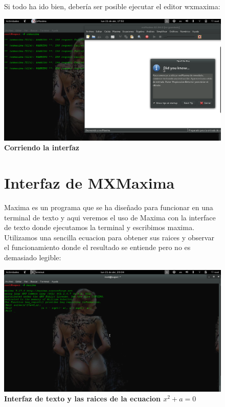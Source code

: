 \documentclass[10pt,a4paper]{book}
\begin{document}
\begin{small}
\begin{enumerate}
\begin{figure}[htb]
Si todo ha ido bien, debería ser posible ejecutar el editor wxmaxima:\\
\begin{center}
\includegraphics[width=13cm]{fotos/cap7}
\caption{\textbf{Corriendo la interfaz}}
\end{center}
\end{figure}
\end{enumerate}


\begin{figure}[htb]
\vspace*{-2,5in}
\section{Interfaz de MXMaxima}

Maxima es un programa que se ha diseñado para funcionar en una terminal de texto y aqui veremos el uso de Maxima con la interface de texto donde ejecutamos la terminal y escribimos maxima.\\

Utilizamos una sencilla ecuacion para obtener sus raices y observar el funcionamiento donde el resultado se entiende pero no es demasiado legible:\\
\begin{center}
\includegraphics[width=13cm]{fotos/cap8}
\caption{\textbf{Interfaz de texto y las raices de la ecuacion $x^2+a=0$}}



\end{center}
\end{figure}
\end{small}
\end{document}
